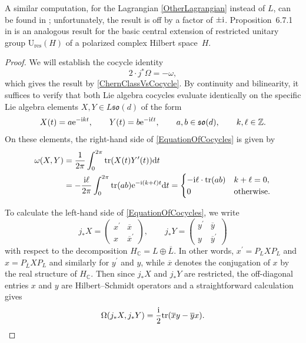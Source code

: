 \documentclass[pdftex]{sigma}
\numberwithin{equation}{section}
\newcommand{\Z}{\mathbb{Z}}
\newcommand{\C}{\mathbb{C}}
\newcommand{\tr}{\mathrm{tr}}
\newcommand{\res}{\mathrm{res}}
\newcommand{\U}{\mathrm{U}}
\begin{document}
A similar computation, for the Lagrangian \eqref{OtherLagrangian} instead of $L$, can be found in \cite{KristelWaldorf1}; unfortunately, the result is off by a factor of $\pm {\rm i}$.
Proposition~6.7.1 in \cite{PressleySegal} is an analogous result for the basic central extension of restricted unitary group $\U_{\res}(H)$ of a polarized complex Hilbert space~$H$.

\begin{proof}We will establish the cocycle identity
\begin{equation}\label{EquationOfCocycles}
 2 \cdot j^*\Omega = -\omega,	
\end{equation}
which gives the result by \eqref{ChernClassVsCocycle}.
By continuity and bilinearity, it suffices to verify that both Lie algebra cocycles evaluate identically on the specific Lie algebra elements $X,Y \in L\mathfrak{so}(d)$ of the form
\begin{equation*}
	X(t) = a {\rm e}^{-{\rm i}kt}, \qquad Y(t) = b {\rm e}^{-{\rm i}\ell t}, \qquad a, b \in \mathfrak{so}(d), \qquad k, \ell \in \Z.
\end{equation*}
On these elements, the right-hand side of \eqref{EquationOfCocycles} is given by
\begin{align}
 \omega(X, Y) &= \frac{1}{2\pi}\int_0^{2\pi} \tr(X(t) Y^\prime(t)) {\rm d}t
 \nonumber\\
 &= -\frac{{\rm i}\ell}{2\pi}\int_0^{2\pi} \tr(ab) {\rm e}^{-{\rm i}(k+\ell)t} {\rm d}t
 = \begin{cases} -{\rm i}\ell \cdot \tr(ab) & k+\ell = 0, \\ 0 & \text{otherwise}.
 \end{cases}\label{ToCompareWithOmega}
\end{align}

To calculate the left-hand side of \eqref{EquationOfCocycles}, we write
	\begin{equation*}
 j_*X =
 \begin{pmatrix}
 	x^\prime & \overline{x} \\ x & \overline{x}^\prime
 \end{pmatrix},	
 \qquad
 j_*Y =
 \begin{pmatrix}
 	y^\prime & \overline{y} \\ y & \overline{y}^\prime
 \end{pmatrix}	
\end{equation*}
with respect to the decomposition $H_\C = L \oplus \overline{L}$.
In other words, $x^\prime = P_LXP_L$ and $x = P_{\overline{L}}XP_L$ and similarly for $y^\prime$ and $y$, while $\overline{x}$ denotes the conjugation of $x$ by the real structure of $H_\C$.
Then since $j_*X$ and $j_*Y$ are restricted, the off-diagonal entries $x$ and $y$ are Hilbert--Schmidt operators and a straightforward calculation gives
\begin{equation}
\label{ReformulatedOmega}
 \Omega(j_*X, j_*Y) = \frac{{\rm i}}{2} \tr(\overline{x} y - \overline{y}x).	
\end{equation}


\end{proof}
\end{document}
